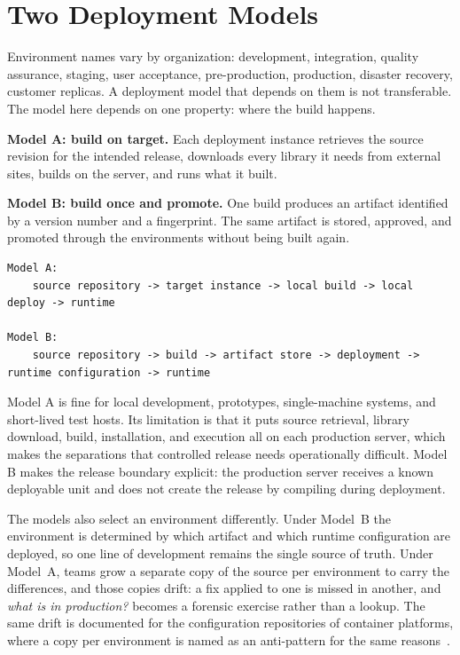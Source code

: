 \documentclass[11pt]{article}
\begin{document}
\section{Two Deployment Models}

Environment names vary by organization: development, integration, quality assurance, staging, user acceptance, pre-production, production, disaster recovery, customer replicas. A deployment model that depends on them is not transferable. The model here depends on one property: where the build happens.

\textbf{Model A: build on target.} Each deployment instance retrieves the source revision for the intended release, downloads every library it needs from external sites, builds on the server, and runs what it built.

\textbf{Model B: build once and promote.} One build produces an artifact identified by a version number and a fingerprint. The same artifact is stored, approved, and promoted through the environments without being built again.

\begin{lstlisting}
Model A:
    source repository -> target instance -> local build -> local deploy -> runtime

Model B:
    source repository -> build -> artifact store -> deployment -> runtime configuration -> runtime
\end{lstlisting}

Model A is fine for local development, prototypes, single-machine systems, and short-lived test hosts. Its limitation is that it puts source retrieval, library download, build, installation, and execution all on each production server, which makes the separations that controlled release needs operationally difficult. Model B makes the release boundary explicit: the production server receives a known deployable unit and does not create the release by compiling during deployment.

The models also select an environment differently. Under Model~B the environment is determined by which artifact and which runtime configuration are deployed, so one line of development remains the single source of truth. Under Model~A, teams grow a separate copy of the source per environment to carry the differences, and those copies drift: a fix applied to one is missed in another, and \emph{what is in production?} becomes a forensic exercise rather than a lookup. The same drift is documented for the configuration repositories of container platforms, where a copy per environment is named as an anti-pattern for the same reasons~\cite{Kapelonis}.
\end{document}
